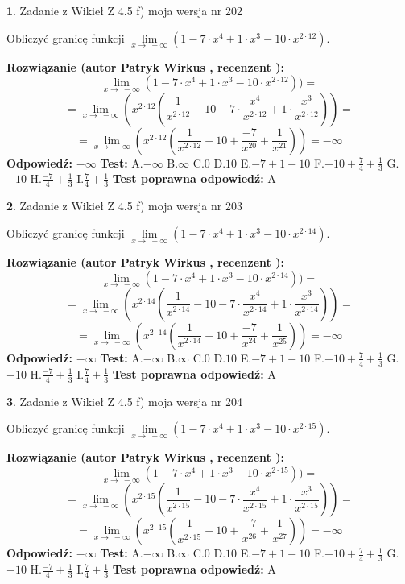 \documentclass[12pt, a4paper]{article}
\theoremstyle{definition} %
\newtheorem{zad}{}
\newcommand{\zadStart}[1]{\begin{zad}#1\newline}
\newcommand{\zadStop}{\end{zad}}
\newcommand{\rozwStart}[2]{\noindent \textbf{Rozwiązanie (autor #1 , recenzent #2): }\newline}
\newcommand{\rozwStop}{\newline}
\newcommand{\odpStart}{\noindent \textbf{Odpowiedź:}\newline}
\newcommand{\odpStop}{\newline}
\newcommand{\testStart}{\noindent \textbf{Test:}\newline}
\newcommand{\testStop}{\newline}
\newcommand{\kluczStart}{\noindent \textbf{Test poprawna odpowiedź:}\newline}
\newcommand{\kluczStop}{\newline}
\begin{document}
\zadStart{Zadanie z Wikieł Z 4.5 f) moja wersja nr 202}



Obliczyć granicę funkcji  $\lim\limits_{x\to\ -\infty}(1 - 7 \cdot x^{4}+1 \cdot x^{3}- 10 \cdot x^{2\cdot12})$.
\zadStop
\rozwStart{Patryk Wirkus}{}
$$\lim\limits_{x\to\ -\infty}(1 - 7 \cdot x^{4}+1 \cdot x^{3}- 10 \cdot x^{2\cdot12}))=$$
$$=\lim\limits_{x\to\ -\infty}(x^{2\cdot12}(\frac{1}{x^{2\cdot12}}-10 -7 \cdot \frac{x^{4}}{x^{2\cdot12}}+1 \cdot \frac{x^{3}}{x^{2\cdot12}}))=$$
$$=\lim\limits_{x\to\ -\infty}(x^{2\cdot12}(\frac{1}{x^{2\cdot12}}-10 + \frac{-7}{x^{20}}+ \frac{1}{x^{21}}))=-\infty$$
\rozwStop
\odpStart
$-\infty$
\odpStop
\testStart
A.$-\infty$ B.$\infty$ C.$0$ D.$10$ E.$-7 + 1 - 10$
F.$-10+\frac{7}{4}+\frac{1}{3}$ G.$-10$
H.$\frac{-7}{4}+\frac{1}{3}$
I.$\frac{7}{4}+\frac{1}{3}$
\testStop
\kluczStart
A
\kluczStop



\zadStart{Zadanie z Wikieł Z 4.5 f) moja wersja nr 203}



Obliczyć granicę funkcji  $\lim\limits_{x\to\ -\infty}(1 - 7 \cdot x^{4}+1 \cdot x^{3}- 10 \cdot x^{2\cdot14})$.
\zadStop
\rozwStart{Patryk Wirkus}{}
$$\lim\limits_{x\to\ -\infty}(1 - 7 \cdot x^{4}+1 \cdot x^{3}- 10 \cdot x^{2\cdot14}))=$$
$$=\lim\limits_{x\to\ -\infty}(x^{2\cdot14}(\frac{1}{x^{2\cdot14}}-10 -7 \cdot \frac{x^{4}}{x^{2\cdot14}}+1 \cdot \frac{x^{3}}{x^{2\cdot14}}))=$$
$$=\lim\limits_{x\to\ -\infty}(x^{2\cdot14}(\frac{1}{x^{2\cdot14}}-10 + \frac{-7}{x^{24}}+ \frac{1}{x^{25}}))=-\infty$$
\rozwStop
\odpStart
$-\infty$
\odpStop
\testStart
A.$-\infty$ B.$\infty$ C.$0$ D.$10$ E.$-7 + 1 - 10$
F.$-10+\frac{7}{4}+\frac{1}{3}$ G.$-10$
H.$\frac{-7}{4}+\frac{1}{3}$
I.$\frac{7}{4}+\frac{1}{3}$
\testStop
\kluczStart
A
\kluczStop



\zadStart{Zadanie z Wikieł Z 4.5 f) moja wersja nr 204}



Obliczyć granicę funkcji  $\lim\limits_{x\to\ -\infty}(1 - 7 \cdot x^{4}+1 \cdot x^{3}- 10 \cdot x^{2\cdot15})$.
\zadStop
\rozwStart{Patryk Wirkus}{}
$$\lim\limits_{x\to\ -\infty}(1 - 7 \cdot x^{4}+1 \cdot x^{3}- 10 \cdot x^{2\cdot15}))=$$
$$=\lim\limits_{x\to\ -\infty}(x^{2\cdot15}(\frac{1}{x^{2\cdot15}}-10 -7 \cdot \frac{x^{4}}{x^{2\cdot15}}+1 \cdot \frac{x^{3}}{x^{2\cdot15}}))=$$
$$=\lim\limits_{x\to\ -\infty}(x^{2\cdot15}(\frac{1}{x^{2\cdot15}}-10 + \frac{-7}{x^{26}}+ \frac{1}{x^{27}}))=-\infty$$
\rozwStop
\odpStart
$-\infty$
\odpStop
\testStart
A.$-\infty$ B.$\infty$ C.$0$ D.$10$ E.$-7 + 1 - 10$
F.$-10+\frac{7}{4}+\frac{1}{3}$ G.$-10$
H.$\frac{-7}{4}+\frac{1}{3}$
I.$\frac{7}{4}+\frac{1}{3}$
\testStop
\kluczStart
A
\kluczStop
\end{document}

